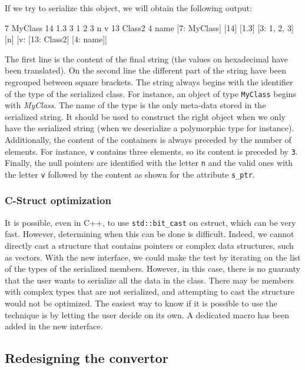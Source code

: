 If we try to serialize this object, we will obtain the following output:

\begin{format}
  7 MyClass 14 1.3 3 1 2 3 n v 13 Class2 4 name
  [7: MyClass] [14] [1.3] [3: 1, 2, 3] [n] [v: [13: Class2] [4: name]]
\end{format}\leavevmode\newline

The first line is the content of the final string (the values on hexadecimal
have been translated). On the second line the different part of the string have
been regrouped between square brackets. The string always begins with the
identifier of the type of the serialized class. For instance, an object of type
\texttt{MyClass} begins with \textit{MyClass}. The name of the type is the only
meta-data stored in the serialized string. It should be used to construct the
right object when we only have the serialized string (when we deserialize a
polymorphic type for instance). Additionally, the content of the containers is
always preceded by the number of elements. For instance, \texttt{v} contains
three elements, so its content is preceded by \texttt{3}. Finally, the null
pointers are identified with the letter \texttt{n} and the valid ones with the
letter \texttt{v} followed by the content as shown for the attribute
\texttt{s\_ptr}.

\subsubsection{C-Struct optimization}

It is possible, even in C++, to use \texttt{std::bit\_cast} on \gls{cstruct},
which can be very fast. However, determining when this can be done is difficult.
Indeed, we cannot directly cast a structure that contains pointers or complex
data structures, such as vectors. With the new interface, we could make the test
by iterating on the list of the types of the serialized members. However, in
this case, there is no guaranty that the user wants to serialize all the data in
the class. There may be members with complex types that are not serialized, and
attempting to cast the structure would not be optimized. The easiest way to know
if it is possible to use the technique is by letting the user decide on its own.
A dedicated macro has been added in the new interface.

\subsection{Redesigning the convertor}
\label{sec:convertor}

